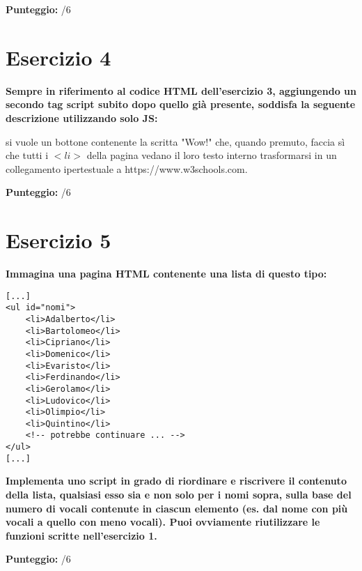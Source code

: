 \documentclass{article}
\begin{document}
\begin{flushright}\textbf{Punteggio:} \underline{\hspace{1cm}}/6\end{flushright}



\section*{Esercizio 4}

\textbf{Sempre in riferimento al codice HTML dell'esercizio 3, aggiungendo un secondo tag script subito dopo quello già presente, soddisfa la seguente descrizione utilizzando solo JS:}

\bigbreak

si vuole un bottone contenente la scritta "Wow!" che, quando premuto, faccia sì che tutti i $<li>$ della pagina vedano il loro testo interno trasformarsi in un collegamento ipertestuale a https://www.w3schools.com.


\begin{flushright}\textbf{Punteggio:} \underline{\hspace{1cm}}/6\end{flushright}

\section*{Esercizio 5}

\textbf{Immagina una pagina HTML contenente una lista di questo tipo:}

\begin{lstlisting}
[...]
<ul id="nomi">
    <li>Adalberto</li>
    <li>Bartolomeo</li>
    <li>Cipriano</li>
    <li>Domenico</li>
    <li>Evaristo</li>
    <li>Ferdinando</li>
    <li>Gerolamo</li>
    <li>Ludovico</li>
    <li>Olimpio</li>
    <li>Quintino</li>
    <!-- potrebbe continuare ... -->
</ul>
[...]
\end{lstlisting}

\textbf{Implementa uno script in grado di riordinare e riscrivere il contenuto della lista, qualsiasi esso sia e non solo per i nomi sopra, sulla base del numero di vocali contenute in ciascun elemento (es. dal nome con più vocali a quello con meno vocali). Puoi ovviamente riutilizzare le funzioni scritte nell'esercizio 1.}

\begin{flushright}\textbf{Punteggio:} \underline{\hspace{1cm}}/6\end{flushright}

\end{document}
